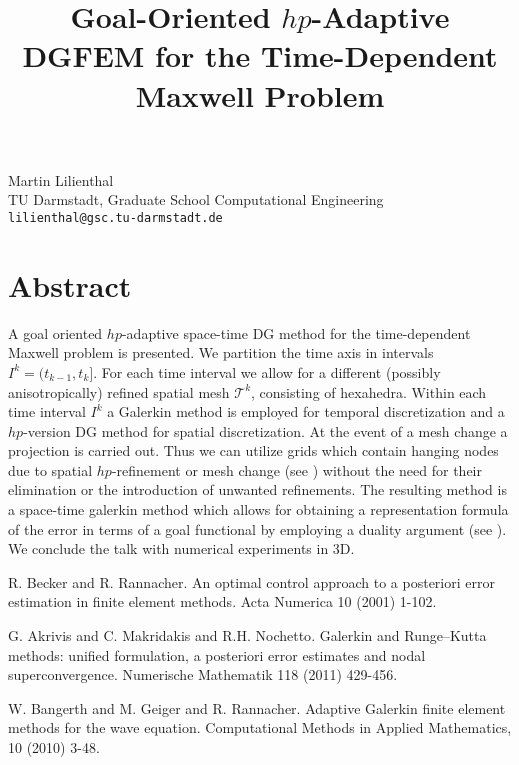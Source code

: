 \title{Goal-Oriented $hp$-Adaptive DGFEM for the Time-Dependent Maxwell Problem}
 \author{} \institute{}
\maketitle
\begin{center}
{\large Martin Lilienthal}\\
TU Darmstadt, Graduate School Computational Engineering\\
{\tt lilienthal@gsc.tu-darmstadt.de}

\end{center}

\section*{Abstract}

A goal oriented $hp$-adaptive space-time DG method for the time-dependent Maxwell problem is presented. 
We partition the time axis in intervals $I^k=(t_{k-1},t_k]$. For each time interval we allow for a different (possibly anisotropically) refined spatial mesh  $\mathcal{T}^k$, consisting of hexahedra. Within each time interval $I^k$ a Galerkin method \cite{akrivis2010galerkin}  is employed for temporal discretization and a $hp$-version DG method for spatial discretization. At the event of a mesh change a projection is carried out. Thus we can utilize grids which contain hanging nodes due to spatial $hp$-refinement or mesh change (see \cite{rannacher2010adaptive}) without the need for their elimination or the introduction of unwanted refinements. The resulting method is a space-time galerkin method which allows for obtaining a representation formula of the error in terms of a goal functional by employing a duality argument (see \cite{becker2001optimal}). We conclude the talk with numerical experiments in 3D.


\begin{thebibliography}{10}

{\sc R. Becker and R. Rannacher}. {An optimal control approach to a posteriori error estimation in finite element methods}. Acta Numerica 10 (2001) 1-102.



{\sc G. Akrivis and C. Makridakis and R.H. Nochetto}. {Galerkin and Runge--Kutta methods: unified formulation, a posteriori error estimates and nodal superconvergence}. Numerische Mathematik 118 (2011) 429-456.



{\sc W. Bangerth and M. Geiger and R. Rannacher}. {Adaptive Galerkin finite element methods for the wave equation}. Computational Methods in Applied Mathematics, 10 (2010) 3-48.

\end{thebibliography}
